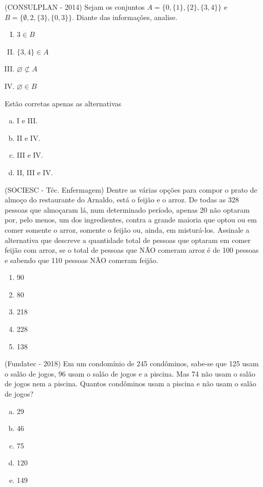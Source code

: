 \begin{exer}
 (CONSULPLAN - 2014) Sejam os conjuntos $A = \{0, \{1\}, \{2\}, \{3, 4\}\}$ e $B = \{\emptyset, 2, \{3\}, \{0, 3\}\}$. Diante das informações, analise.
 \begin{multicols}{2}
 \begin{enumerate}[I)]
  \item $3 \in B$
  \item $\{3, 4\} \in A$
  \item $\varnothing \nsubset A$
  \item $\varnothing \in B$
 \end{enumerate}
 \end{multicols}
 Estão corretas apenas as alternativas
 \begin{multicols}{2}
 \begin{enumerate}[a)]
 \item I e III.
 \item II e IV.
 \item III e IV.
 \item II, III e IV.
 \end{enumerate}
 \end{multicols}
\end{exer}

\begin{exer}
(SOCIESC - Téc. Enfermagem) Dentre as várias opções para compor o prato de almoço do restaurante do Arnaldo, está o feijão e o arroz. De todas as 328 pessoas que almoçaram lá, num determinado período, apenas 20 não optaram por, pelo menos, um dos ingredientes, contra a grande maioria que optou ou em comer somente o arroz, somente o feijão ou, ainda, em misturá-los. Assinale a alternativa que descreve a quantidade total de pessoas que optaram em comer feijão com arroz, se o total de pessoas que NÃO comeram arroz é de 100 pessoas e sabendo que 110 pessoas NÃO comeram feijão.
  \begin{enumerate}
  \item 90
  \item 80
  \item 218
  \item 228
  \item 138
 \end{enumerate}
 \end{exer}

 \begin{exer}
(Fundatec - 2018) Em um condomínio de 245 condôminos, sabe-se que 125 usam o salão de jogos, 96 usam o salão de jogos e a piscina. Mas 74 não usam o salão de jogos nem a piscina. Quantos condôminos usam a piscina e não usam o salão de jogos?
\begin{multicols}{5}
\begin{enumerate}[a)]
\item 29
\item 46
\item 75
\item 120
\item 149
\end{enumerate}
\end{multicols}
\end{exer}

